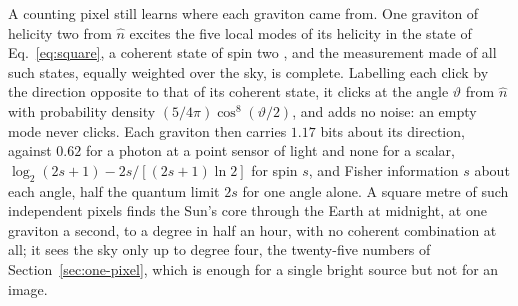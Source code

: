 A counting pixel still learns where each graviton came from. One graviton of
helicity two from $\hat n$ excites the five local modes of its helicity in the
state of Eq.~\eqref{eq:square}, a coherent state of spin two
\cite{Arecchi1972}, and the measurement made of all such states, equally
weighted over the sky, is complete. Labelling each click by the direction
opposite to that of its coherent state, it clicks at the angle $\vartheta$ from
$\hat n$ with probability density $(5/4\pi)\cos^8(\vartheta/2)$, and adds no
noise: an empty mode never clicks. Each graviton then carries $1.17$ bits about
its direction, against $0.62$ for a photon at a point sensor of light and none
for a scalar, $\log_2(2s+1) - 2s/[(2s+1)\ln 2]$ for spin $s$, and Fisher
information $s$ about each angle, half the quantum limit $2s$ for one angle
alone. A square metre of such independent pixels finds the Sun's core through
the Earth at midnight, at one graviton a second, to a degree in half an hour,
with no coherent combination at all; it sees the sky only up to degree four,
the twenty-five numbers of Section~\ref{sec:one-pixel}, which is enough for a
single bright source but not for an image.

